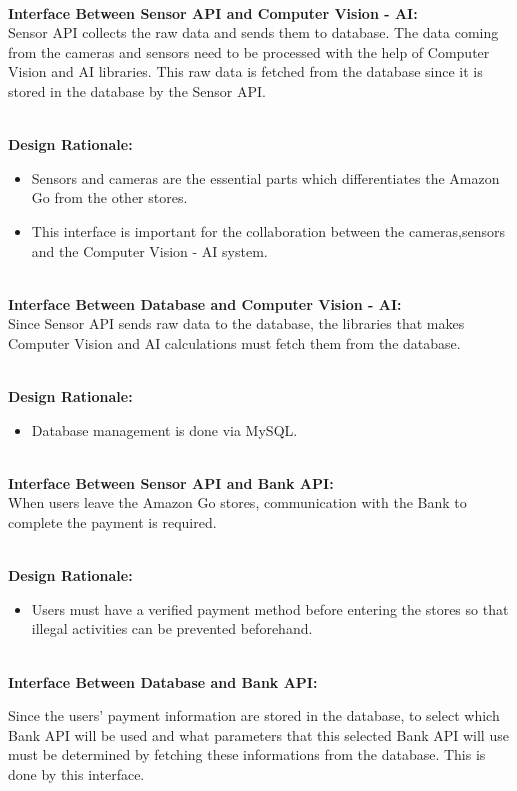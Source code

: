 \documentclass[11pt]{article}
\begin{document}
    \textbf{\\Interface Between Sensor API and Computer Vision - AI:\\}
    Sensor API collects the raw data and sends them to database. The data coming from the cameras and sensors need to be processed with the help of
    Computer Vision and AI libraries. This raw data is fetched from the database since it is stored in the database by the Sensor API. 

    \textbf{\\Design Rationale:}
    \begin{itemize}
        \item Sensors and cameras are the essential parts which differentiates the Amazon Go from the other stores.  
        \item This interface is important for the collaboration between the cameras,sensors and the Computer Vision - AI system.
    \end{itemize}

    \textbf{\\Interface Between Database and Computer Vision - AI:\\}
        Since Sensor API sends raw data to the database, the libraries that makes Computer Vision and AI calculations must fetch them from the database.    

    \textbf{\\Design Rationale:}
    \begin{itemize}
       \item Database management is done via MySQL.
    \end{itemize}

    \textbf{\\Interface Between Sensor API and Bank API:\\}
        When users leave the Amazon Go stores, communication with the Bank to complete the payment is required.
    
    \textbf{\\Design Rationale:}
    \begin{itemize}
       \item Users must have a verified payment method before entering the stores so that illegal activities can be prevented beforehand.
    \end{itemize}

    \textbf{\\Interface Between Database and Bank API:\\}
    
       Since the users' payment information are stored in the database, to select which Bank API will be used and what parameters that this selected Bank API will use must be 
       determined by fetching these informations from the database. This is done by this interface.
\end{document}
